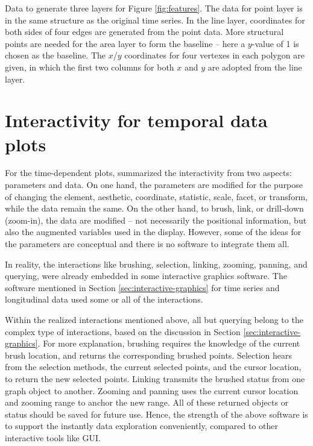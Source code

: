 \documentclass[12pt]{article}
\begin{document}
\begin{enumerate}
\begin{center}
\begin{table}[H]
\caption{\label{tab:coordinates-for-layers}Data to generate three layers for Figure \ref{fig:features}. The data for point layer is in the same structure as the original time series. In the line layer, coordinates for both sides of four edges are generated from the point data. More structural points are needed for the area layer to form the baseline -- here a $y$-value of 1 is chosen as the baseline. The $x$/$y$ coordinates for four vertexes in each polygon are given, in which the first two columns for both $x$ and $y$ are adopted from the line layer.}
\end{table}

\par\end{center}

\end{enumerate}


\section{Interactivity for temporal data plots\label{sec:Design-of-interactions}}

For the time-dependent plots, \citet{wills2012visualizing} summarized
the interactivity from two aspects: parameters and data. On one hand,
the parameters are modified for the purpose of changing the element,
aesthetic, coordinate, statistic, scale, facet, or transform, while
the data remain the same. On the other hand, to brush, link, or drill-down (zoom-in),
the data are modified -- not necessarily the positional information,
but also the augmented variables used in the display. However, some
of the ideas for the parameters are conceptual and there is no software
to integrate them all.

In reality, the interactions like brushing, selection, linking, zooming,
panning, and querying, were already embedded in some interactive graphics
software. The software mentioned in Section \ref{sec:interactive-graphics}
for time series and longitudinal data
used some or all of the interactions.

Within the realized interactions mentioned above, all but querying
belong to the complex type of interactions, based on the discussion
in Section \ref{sec:interactive-graphics}. For more explanation,
brushing requires the knowledge of the current brush location, and
returns the corresponding brushed points. Selection hears from the
selection methods, the current selected points, and the cursor location,
to return the new selected points. Linking transmits the brushed status
from one graph object to another. Zooming and panning uses the current
cursor location and zooming range to anchor the new range. All of
these returned objects or status should be saved for future use. Hence,
the strength of the above software is to support the instantly data
exploration conveniently, compared to other interactive tools like
GUI. 
\end{document}
